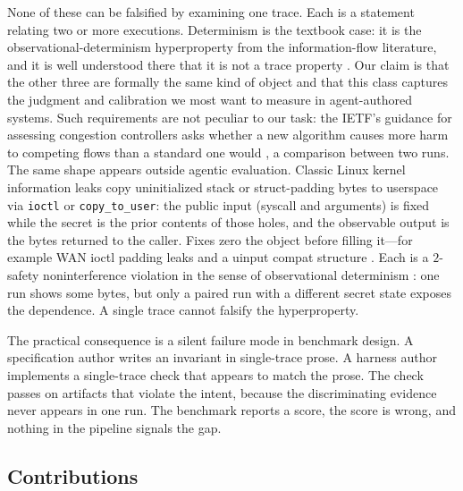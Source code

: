 \documentclass[sigconf,review,anonymous]{acmart}
\begin{document}
	None of these can be falsified by examining one trace. Each is a statement
	relating two or more executions. Determinism is the textbook case: it is
	the observational-determinism hyperproperty from the information-flow
	literature, and it is well understood there that it is not a trace property
	\cite{clarkson2010,zdancewic2003}. Our claim is that the other three are
	formally the same kind of object and that this class captures the
	judgment and calibration we most want to measure in agent-authored
	systems. Such requirements are not peculiar to our task: the IETF's
	guidance for assessing congestion controllers asks whether a new
	algorithm causes more harm to competing flows than a standard one
	would \cite{rfc9743}, a comparison between two runs.
	The same shape appears outside agentic evaluation. Classic Linux
	kernel information leaks copy uninitialized stack or struct-padding
	bytes to userspace via \texttt{ioctl} or \texttt{copy\_to\_user}: the
	public input (syscall and arguments) is fixed while the secret is the
	prior contents of those holes, and the observable output is the bytes
	returned to the caller. Fixes zero the object before filling it---for
	example WAN ioctl padding leaks
	\cite{linux-cve-2014-1444,linux-cve-2014-1445} and a uinput compat
	structure \cite{linux-cve-2025-40035}. Each is a $2$-safety
	noninterference violation in the sense of observational determinism
	\cite{clarkson2010,zdancewic2003}: one run shows some bytes, but only
	a paired run with a different secret state exposes the dependence.
	A single trace cannot falsify the hyperproperty.
	
	The practical consequence is a silent failure mode in benchmark design. A
	specification author writes an invariant in single-trace prose. A harness
	author implements a single-trace check that appears to match the prose. The
	check passes on artifacts that violate the intent, because the discriminating
	evidence never appears in one run. The benchmark reports a score, the score
	is wrong, and nothing in the pipeline signals the gap.
	
	\subsection{Contributions}
	
\end{document}
